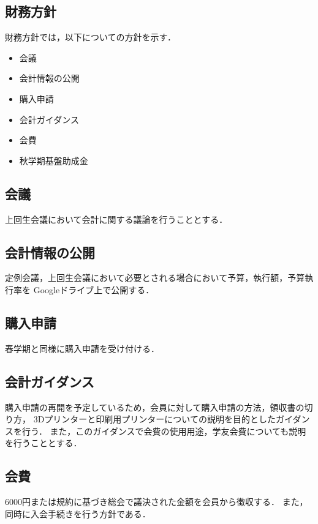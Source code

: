 \subsection*{財務方針}



財務方針では，以下についての方針を示す．
\begin{itemize}
  \item 会議
  \item 会計情報の公開
  \item 購入申請
  \item 会計ガイダンス
  \item 会費
  \item 秋学期基盤助成金
\end{itemize}

\subsection*{会議}
上回生会議において会計に関する議論を行うこととする．

\subsection*{会計情報の公開}
定例会議，上回生会議において必要とされる場合において予算，執行額，予算執行率を
Googleドライブ上で公開する．

\subsection*{購入申請}
春学期と同様に購入申請を受け付ける．

\subsection*{会計ガイダンス}
購入申請の再開を予定しているため，会員に対して購入申請の方法，領収書の切り方，
3Dプリンターと印刷用プリンターについての説明を目的としたガイダンスを行う．
また，このガイダンスで会費の使用用途，学友会費についても説明を行うこととする．

\subsection*{会費}
6000円または規約に基づき総会で議決された金額を会員から徴収する．
また，同時に入会手続きを行う方針である．
